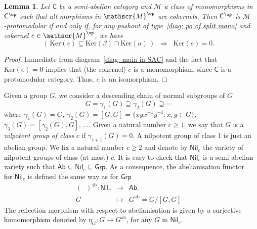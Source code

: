 \documentclass[11pt]{amsart}
\theoremstyle{plain}
\newtheorem{lemma}[subsection]{Lemma}
\theoremstyle{definition}
\theoremstyle{remark}
\newcommand{\defn}[1]{\emph{#1}}
\newcommand{\To}{\Rightarrow}
\newcommand{\C}{\ensuremath{\mathsf{C}}}
\newcommand{\Grp}{\ensuremath{\mathsf{Grp}}}
\newcommand{\Ab}{\ensuremath{\mathsf{Ab}}}
\newcommand{\Nil}{\ensuremath{\mathsf{Nil}}}
\newcommand{\M}{\ensuremath{\mathscr{M}}}
\newcommand{\Ker}{\ensuremath{\mathrm{Ker}}}
\newcommand{\ab}{\ensuremath{\mathrm{ab}}}
\begin{document}
\begin{lemma}\label{lem: M-proto for Nil_c} Let $\C$ be a semi-abelian category and $\M$ a class of monomorphisms in $\C^\op$ such that all morphisms in $\M^\op$ are cokernels. Then $\C^\op$ is $\M$-protomodular if and only if, for any pushout of type~\eqref{diag: po of split mono} and cokernel $e\in \M^\op$, we have
\begin{equation}\label{diag: M-proto in C^op with kernels}
 \left(\, \Ker(e) \subseteq \Ker(\beta)\cap \Ker(u) \,\right) \;\;\To\;\; \Ker(e)=0.
\end{equation}
\end{lemma}
\begin{proof} Immediate from diagram~\eqref{diag: main in SAC} and the fact that $\Ker(e)=0$ implies that (the cokernel) $e$ is a monomorphism, since $\C$ is a protomodular category. Thus, $e$ is an isomorphism.
\end{proof}

Given a group $G$, we consider a descending chain of normal subgroups of $G$
\[
	G= \gamma_1(G) \supseteq \gamma_2(G) \supseteq \cdots
\]
where $\gamma_1(G)=G$, $\gamma_2(G)=[G,G]=\{xyx^{-1}y^{-1}: x,y\in G\}$, $\gamma_3(G)=[\gamma_2(G),G]$, $\dots$. Given a natural number $c\ge 1$, we say that $G$ is a \defn{nilpotent group of class $c$} if $\gamma_{c+1}(G)=0$. A nilpotent group of class 1 is just an abelian group. We fix a natural number $c\ge 2$ and denote by $\Nil_c$ the variety of nilpotent groups of class (at most) $c$. It is easy to check that $\Nil_c$ is a semi-abelian variety such that $\Ab\subseteq \Nil_c\subseteq \Grp$. As a consequence, the abelianisation functor for $\Nil_c$ is defined the same way as for $\Grp$
\[
	\begin{array}{rcl}
		(\;\;)^{\ab}: \Nil_c & \longrightarrow & \Ab. \\
		G & \longmapsto & G^\ab=G/[G,G]
	\end{array}
\]
The reflection morphism with respect to abelianisation is given by a surjective homomorphism denoted by $\eta_G\colon G\rightarrow G^\ab$, for any $G$ in $\Nil_c$.
\end{document}
